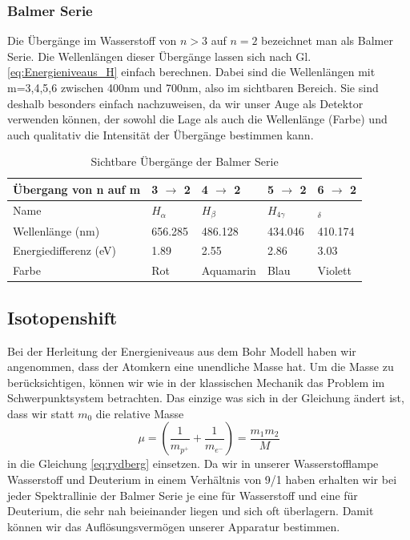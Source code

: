 \documentclass[]{article}
\begin{document}
\subsubsection{Balmer Serie}
Die Übergänge im Wasserstoff von $n>3$ auf $n=2$ bezeichnet man als Balmer Serie. Die Wellenlängen dieser Übergänge lassen sich nach Gl. \ref{eq:Energieniveaus_H} einfach berechnen. Dabei sind die Wellenlängen mit m=3,4,5,6 zwischen 400nm und 700nm, also im sichtbaren Bereich. Sie sind deshalb besonders einfach nachzuweisen, da wir unser Auge als Detektor verwenden können, der sowohl die Lage als auch die Wellenlänge (Farbe) und auch qualitativ die Intensität der Übergänge bestimmen kann.
\begin{table}[H]
	\centering
	\caption{Sichtbare Übergänge der Balmer Serie}
	\label{my-label}
	\begin{tabular}{|l|l|l|l|l|}
		\hline
		Übergang von n auf m  & 3 $\rightarrow$  2 & 4 $\rightarrow$ 2 & 5 $\rightarrow$ 2 & 6 $  \rightarrow$ 2 \\ \hline
		Name                  & $H_{\alpha }$      & $H_{\beta}$        & $H_{4\gamma }$      & $_{\delta}$       \\ \hline
		Wellenlänge (nm)      & 656.285                      & 486.128                      & 434.046                       & 410.174                        \\ \hline
		Energiedifferenz (eV) & 1.89                           & 2.55                           & 2.86                           & 3.03                           \\ \hline
		Farbe                 & Rot                            & Aquamarin                      & Blau                           & Violett                        \\ \hline

	\end{tabular}
\end{table}


\subsection{Isotopenshift}
Bei der Herleitung der Energieniveaus aus dem Bohr Modell haben wir angenommen, dass der Atomkern eine unendliche Masse hat. Um die Masse zu berücksichtigen, können wir wie in der klassischen Mechanik das Problem im Schwerpunktsystem betrachten. Das einzige was sich in der Gleichung ändert ist, dass wir statt $m_0$ die relative Masse 
\begin{equation}
	\mu=\left(\frac{1}{m_{p^+}}+\frac{1}{m_{e^-}}  \right)= \frac{m_1 m_2}{M}
\end{equation}
in die Gleichung \ref{eq:rydberg} einsetzen. Da wir in unserer Wasserstofflampe Wasserstoff und Deuterium in einem Verhältnis von 9/1 haben erhalten wir bei jeder Spektrallinie der Balmer Serie je eine für Wasserstoff und eine für Deuterium, die sehr nah beieinander liegen und sich oft überlagern. Damit können wir das Auflösungsvermögen unserer Apparatur bestimmen.
\end{document}
